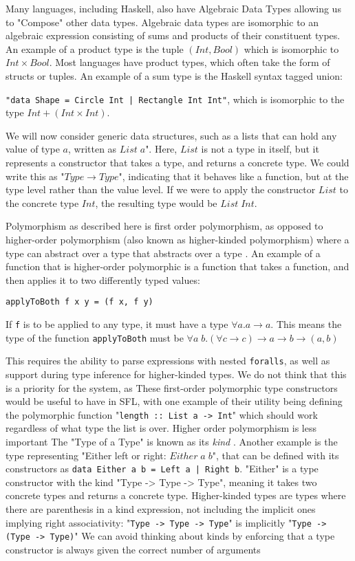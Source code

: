 Many languages, including Haskell, also have Algebraic Data Types allowing us to "Compose" other data types. Algebraic data types are isomorphic to an algebraic expression consisting of sums and products of their constituent types. An example of a product type is the tuple \((Int,Bool)\) which is isomorphic to \(Int \times Bool\). Most languages have product types, which often take the form of structs or tuples. 
An example of a sum type is the Haskell syntax tagged union:

\noindent\verb!"data Shape = Circle Int | Rectangle Int Int"!, which is isomorphic to the type \(Int + (Int \times Int)\). 

We will now consider generic data structures, such as a lists that can hold any value of type $a$, written as \(List\;a\)". Here, \(List\) is not a type in itself, but it represents a constructor that takes a type, and returns a concrete type. We could write this as "$Type \rightarrow Type$", indicating that it behaves like a function, but at the type level rather than the value level. If we were to apply the constructor \(List\) to the concrete type \(Int\), the resulting type would be \(List \;Int\). 

Polymorphism as described here is first order polymorphism, as opposed to higher-order polymorphism (also known as higher-kinded polymorphism) where a type can abstract over a type that abstracts over a type \cite{pierce2002types}. An example of a function that is higher-order polymorphic is a function that takes a function, and then applies it to two differently typed values:
\begin{lstlisting}
applyToBoth f x y = (f x, f y)
\end{lstlisting}
If \verb|f| is to be applied to any type, it must have a type \(\forall a. a\rightarrow a\). This means the type of the function \verb|applyToBoth| must be \(\forall a \;b.(\forall c \rightarrow c) \rightarrow a \rightarrow b \rightarrow (a, b)\)

This requires the ability to parse expressions with nested \verb|foralls|, as well as support during type inference for higher-kinded types. We do not think that this is a priority for the system, as 
These first-order polymorphic type constructors would be useful to have in SFL, with one example of their utility being defining the polymorphic function "\verb|length :: List a -> Int|" which should work regardless of what type the list is over. Higher order polymorphism is less important
The "Type of a Type" is known as its \emph{kind} \cite{pierce2002types}. Another example is the type representing "Either left or right: \(Either \;a\;b\)", that can be defined with its constructors as \verb!data Either a b = Left a | Right b!. "Either" is a type constructor with the kind "Type -> Type -> Type", meaning it takes two concrete types and returns a concrete type. 
Higher-kinded types are types where there are parenthesis in a kind expression, not including the implicit ones implying right associativity: 
"\verb|Type -> Type -> Type|" is implicitly "\verb|Type -> (Type -> Type)|"
We can avoid thinking about kinds by enforcing that a type constructor is always given the correct number of arguments

